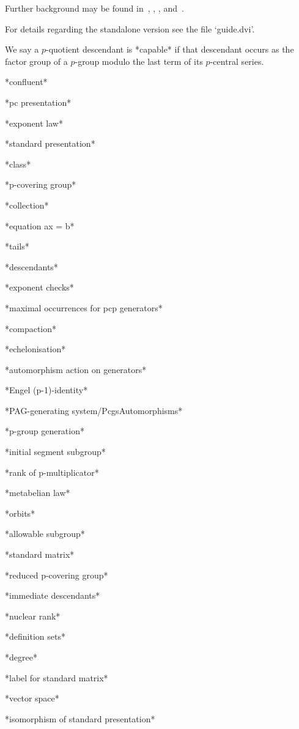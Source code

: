 \endlist

Further   background   may   be   found   in~\cite{OBr95},   \cite{Vau84},
\cite{NNN98}, and~\cite{Sims94}.

For details regarding the standalone version see the file `guide.dvi'.

We say a $p$-quotient descendant is *capable* if that  descendant  occurs
as the  factor  group  of  a  $p$-group  modulo  the  last  term  of  its
$p$-central series.

*confluent*

*pc presentation*

*exponent law*

*standard presentation*

*class*

*p-covering group*

*collection*

*equation ax = b*

*tails*

*descendants*

*exponent checks*

*maximal occurrences for pcp generators*

*compaction*

*echelonisation*

*automorphism action on generators*

*Engel (p-1)-identity*

*PAG-generating system/PcgsAutomorphisms*

*p-group generation*

*initial segment subgroup*

*rank of p-multiplicator*

*metabelian law*

*orbits*

*allowable subgroup*

*standard matrix*

*reduced p-covering group*

*immediate descendants*

*nuclear rank*

*definition sets*

*degree*

*label for standard matrix*

*vector space*

*isomorphism of standard presentation*

